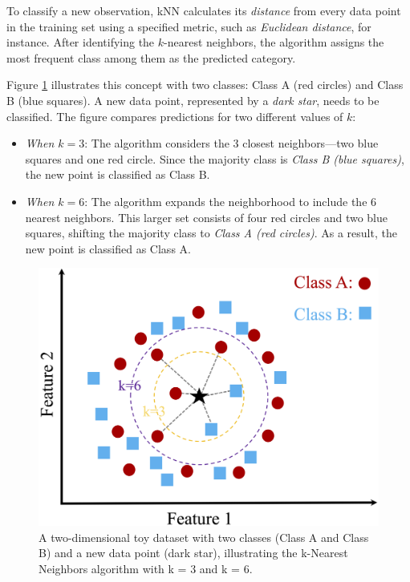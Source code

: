 \documentclass[
  11pt,
]{book}
\providecommand{\tightlist}{%
  \setlength{\itemsep}{0pt}\setlength{\parskip}{0pt}}
\theoremstyle{definition}
\theoremstyle{definition}
\theoremstyle{definition}
\theoremstyle{definition}
\theoremstyle{remark}
\begin{document}
To classify a new observation, kNN calculates its \emph{distance} from every data point in the training set using a specified metric, such as \emph{Euclidean distance}, for instance. After identifying the \(k\)-nearest neighbors, the algorithm assigns the most frequent class among them as the predicted category.

Figure \ref{fig:knn-image} illustrates this concept with two classes: {Class A (red circles)} and {Class B (blue squares)}. A new data point, represented by a \emph{dark star}, needs to be classified. The figure compares predictions for two different values of \(k\):

\begin{itemize}
\tightlist
\item
  \emph{When \(k = 3\)}: The algorithm considers the 3 closest neighbors---two blue squares and one red circle. Since the majority class is \emph{Class B (blue squares)}, the new point is classified as Class B.\\
\item
  \emph{When \(k = 6\)}: The algorithm expands the neighborhood to include the 6 nearest neighbors. This larger set consists of four red circles and two blue squares, shifting the majority class to \emph{Class A (red circles)}. As a result, the new point is classified as Class A.
\end{itemize}

\begin{figure}[H]

{\centering \includegraphics[width=0.75\linewidth]{images/ch7_knn} 

}

\caption{A two-dimensional toy dataset with two classes (Class A and Class B) and a new data point (dark star), illustrating the k-Nearest Neighbors algorithm with k = 3 and k = 6.}\label{fig:knn-image}
\end{figure}
\end{document}
